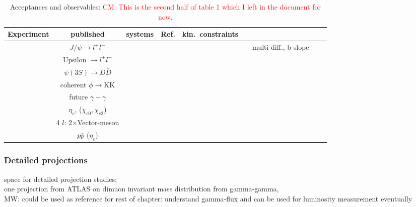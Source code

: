 \documentclass[../report.tex]{subfiles}
\begin{document}
\begin{table}[htbp]
 {%
\centering
\begin{tabular}{|c|c|c|c|l|c|c|c|c|}
\hline
Experiment & published & systems & Ref. & kin.~constraints \\
\hline
\hline
&
$J/\psi \to l^+l^-$                    &
&
&
&
&
multi-diff., b-slope 
\\
&
Upsilon $\to l^+l^-$                   &
&
&
&
&
\\
&
$\psi(3S) \to D\bar{D}$                 &
&
&
&
&
\\
&
coherent $\phi \to$KK             &
&
&
&
&
\\
\hline
&
future $\gamma-\gamma$                 &
&
&
&
&
\\
\hline
&
$\eta_c$, ($\chi_{c0},\chi_{c2}$)    &
&
&
&
&
\\
&
4 $l$: 2$\times$Vector-meson   &
&
&
&
&
\\
&
$p\bar{p}$ ($\eta_c$)                 &
&
&
&
&
\\

\hline
\end{tabular}
\caption{Acceptances and observables: \textcolor{red}{CM: This is the second half of table 1 which I left in the document for now.}  }
}
\end{table}


\subsubsection{Detailed projections}
space for detailed projection studies; \\
one projection from ATLAS on dimuon invariant mass distribution from gamma-gamma, \\ MW: could be used as reference for rest of chapter: understand gamma-flux and can be used for luminosity measurement eventually
\end{document}
